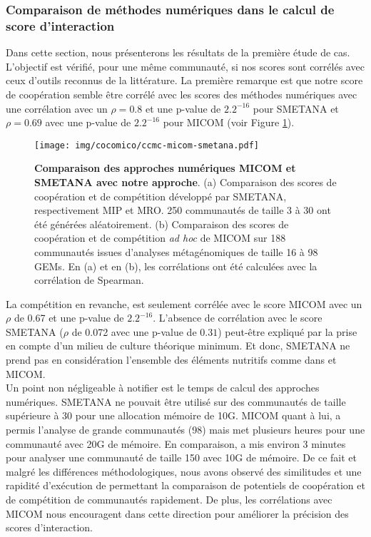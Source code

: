 \documentclass[../main.tex]{subfiles}
\begin{document}
\subsubsection*{Comparaison de méthodes numériques dans le calcul de score d'interaction}
Dans cette section, nous présenterons les résultats de la première étude de cas. L'objectif est vérifié, pour une même communauté, si nos scores sont corrélés avec ceux d'outils reconnus de la littérature.
La première remarque est que notre score de coopération semble être corrélé avec les scores des méthodes numériques avec une corrélation avec un $\rho = 0.8$ et une p-value de $2.2^{-16}$ pour SMETANA et $\rho = 0.69 $ avec une p-value de $2.2^{-16}$ pour MICOM (voir Figure \ref{fig:ccmc-micom-smetana}).

\begin{figure}[H]
    \centering
    \texttt{[image: img/cocomico/ccmc-micom-smetana.pdf]}
    \caption{\textbf{Comparaison des approches numériques MICOM et SMETANA avec notre approche}. (a) Comparaison des scores de coopération et de compétition développé par SMETANA,  respectivement MIP et MRO. 250 communautés de taille 3 à 30 ont été générées aléatoirement. (b) Comparaison des scores de coopération et de compétition \textit{ad hoc}  de MICOM sur 188 communautés issues d'analyses métagénomiques de taille 16 à 98 GEMs. En (a) et en (b), les corrélations ont été calculées avec la corrélation de Spearman.}
    \label{fig:ccmc-micom-smetana}
\end{figure}

La compétition en revanche, est seulement corrélée avec le score MICOM avec un $\rho$ de 0.67 et une p-value de $2.2^{-16}$. L'absence de corrélation avec le score SMETANA ($\rho$ de 0.072 avec une p-value de $0.31$) peut-être expliqué par la prise en compte d'un milieu de culture théorique minimum. Et donc, SMETANA ne prend pas en considération l'ensemble des éléments nutritifs comme dans \ccmc et MICOM. \\



Un point non négligeable à notifier est le temps de calcul des approches numériques. SMETANA ne pouvait être utilisé sur des communautés de taille supérieure à 30 pour une allocation mémoire de 10G. MICOM quant à lui, a permis l'analyse de grande communautés (98) mais met plusieurs heures pour une communauté avec 20G de mémoire. En comparaison, \ccmc a mis environ 3 minutes pour analyser une communauté de taille 150 avec 10G de mémoire.
De ce fait et malgré les différences méthodologiques, nous avons observé des similitudes et une rapidité d'exécution de \ccmc permettant la comparaison de potentiels de coopération et de compétition de communautés rapidement. De plus, les corrélations avec MICOM nous encouragent dans cette direction pour améliorer la précision des scores d'interaction.
\end{document}
